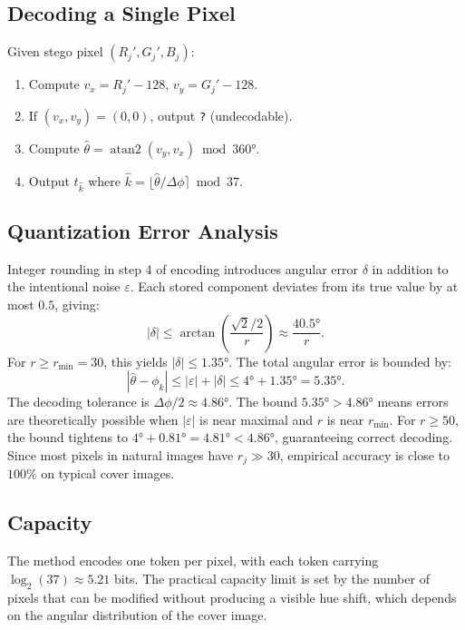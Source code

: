 \documentclass[12pt]{article}
\begin{document}
\subsection{Decoding a Single Pixel}

Given stego pixel $(R_j', G_j', B_j)$:
\begin{enumerate}
    \item Compute $v_x = R_j' - 128$, $v_y = G_j' - 128$.
    \item If $(v_x, v_y) = (0,0)$, output \texttt{?} (undecodable).
    \item Compute $\hat\theta = \operatorname{atan2}(v_y, v_x) \bmod 360°$.
    \item Output $t_{\hat k}$ where
          $\hat k = \lfloor \hat\theta/\Delta\phi \rceil \bmod 37$.
\end{enumerate}

\subsection{Quantization Error Analysis}
\label{subsec:quant}

Integer rounding in step 4 of encoding introduces angular error $\delta$
in addition to the intentional noise $\varepsilon$. Each stored component
deviates from its true value by at most $0.5$, giving:
\[
    |\delta| \leq \arctan\!\left(\frac{\sqrt{2}/2}{r}\right)
    \approx \frac{40.5°}{r}.
\]
For $r \geq r_{\min} = 30$, this yields $|\delta| \leq 1.35°$. The total
angular error is bounded by:
\[
    |\hat\theta - \phi_k| \leq |\varepsilon| + |\delta| \leq 4° + 1.35° = 5.35°.
\]
The decoding tolerance is $\Delta\phi/2 \approx 4.86°$. The bound
$5.35° > 4.86°$ means errors are theoretically possible when $|\varepsilon|$
is near maximal and $r$ is near $r_{\min}$. For $r \geq 50$, the bound
tightens to $4° + 0.81° = 4.81° < 4.86°$, guaranteeing correct decoding.
Since most pixels in natural images have $r_j \gg 30$, empirical accuracy is
close to $100\%$ on typical cover images.

\subsection{Capacity}

The method encodes one token per pixel, with each token carrying
$\log_2(37) \approx 5.21$ bits. The practical capacity limit is set by
the number of pixels that can be modified without producing a visible hue
shift, which depends on the angular distribution of the cover image.
\end{document}

